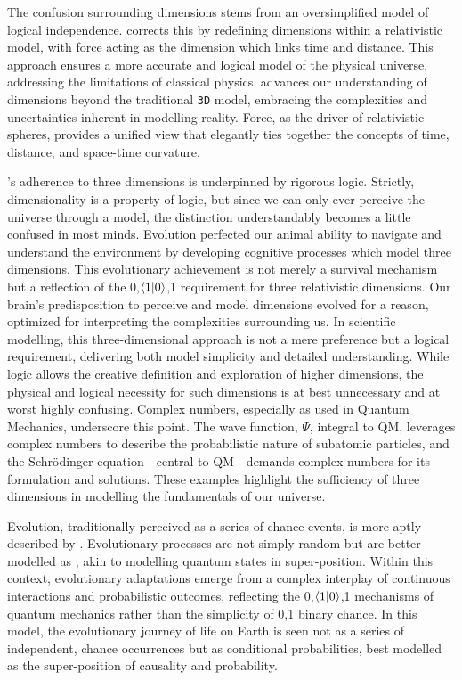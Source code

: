 \documentclass[12pt]{article}
\begin{document}
The confusion surrounding dimensions stems from an oversimplified model of logical independence. \iR{} corrects this by redefining dimensions within a relativistic model, with force acting as the dimension which links time and distance. This approach ensures a more accurate and logical model of the physical universe, addressing the limitations of classical physics. \iR{} advances our understanding of dimensions beyond the traditional \texttt{3D} model, embracing the complexities and uncertainties inherent in modelling reality. Force, as the driver of relativistic spheres, provides a unified view that elegantly ties together the concepts of time, distance, and space-time curvature.

\iR{}'s adherence to three dimensions is underpinned by rigorous logic. Strictly, dimensionality is a property of logic, but since we can only ever perceive the universe through a model, the distinction understandably becomes a little confused in most minds. Evolution perfected our animal ability to navigate and understand the environment by developing cognitive processes which model three dimensions. This evolutionary achievement is not merely a survival mechanism but a reflection of the {0,\(\langle 1 | 0 \rangle\),1} requirement for three relativistic dimensions. Our brain's predisposition to perceive and model dimensions evolved for a reason, optimized for interpreting the complexities surrounding us. In scientific modelling, this three-dimensional approach is not a mere preference but a logical requirement, delivering both model simplicity and detailed understanding. While logic allows the creative definition and exploration of higher dimensions, the physical and logical necessity for such dimensions is at best unnecessary and at worst highly confusing. Complex numbers, especially as used in Quantum Mechanics, underscore this point. The wave function, \(\Psi\), integral to QM, leverages complex numbers to describe the probabilistic nature of subatomic particles, and the Schrödinger equation—central to QM—demands complex numbers for its formulation and solutions. These examples highlight the sufficiency of three dimensions in modelling the fundamentals of our universe.

Evolution, traditionally perceived as a series of chance events, is more aptly described by \iR{}. Evolutionary processes are not simply random but are better modelled as \iR{}, akin to modelling quantum states in super-position. Within this context, evolutionary adaptations emerge from a complex interplay of continuous interactions and probabilistic outcomes, reflecting the {0,\(\langle 1 | 0 \rangle\),1} mechanisms of quantum mechanics rather than the simplicity of {0,1} binary chance. In this model, the evolutionary journey of life on Earth is seen not as a series of independent, chance occurrences but as conditional probabilities, best modelled as the super-position of causality and probability.
\end{document}
